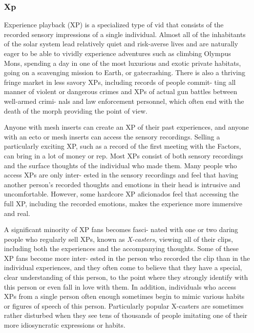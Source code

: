 \subsubsection{Xp}

Experience playback (XP) is a specialized type of vid 
that consists of the recorded sensory impressions of a 
single individual. Almost all of the inhabitants of the 
solar system lead relatively quiet and risk-averse lives 
and are naturally eager to be able to vividly experience 
adventures such as climbing Olympus Mons, spending 
a day in one of the most luxurious and exotic private 
habitats, going on a scavenging mission to Earth, or 
gatecrashing. There is also a thriving fringe market in 
less savory XPs, including records of people commit-
ting all manner of violent or dangerous crimes and 
XPs of actual gun battles between well-armed crimi-
nals and law enforcement personnel, which often end 
with the death of the morph providing the point of 
view.

Anyone with mesh inserts can create an XP of their 
past experiences, and anyone with an ecto or mesh 
inserts can access the sensory recordings. Selling a 
particularly exciting XP, such as a record of the first 
meeting with the Factors, can bring in a lot of money 
or rep. Most XPs consist of both sensory recordings 
and the surface thoughts of the individual who made 
them. Many people who access XPs are only inter-
ested in the sensory recordings and feel that having 
another person's recorded thoughts and emotions in 
their head is intrusive and uncomfortable. However, 
some hardcore XP aficionados feel that accessing the 
full XP, including the recorded emotions, makes the 
experience more immersive and real.

A significant minority of XP fans becomes fasci-
nated with one or two daring people who regularly 
sell XPs, known as \textit{X-casters,} viewing all of their clips, 
including both the experiences and the accompanying 
thoughts. Some of these XP fans become more inter-
ested in the person who recorded the clip than in the 
individual experiences, and they often come to believe 
that they have a special, clear understanding of this 
person, to the point where they strongly identify with 
this person or even fall in love with them. In addition, 
individuals who access XPs from a single person often 
enough sometimes begin to mimic various habits or 
figures of speech of this person. Particularly popular 
X-casters are sometimes rather disturbed when they 
see tens of thousands of people imitating one of their 
more idiosyncratic expressions or habits.

